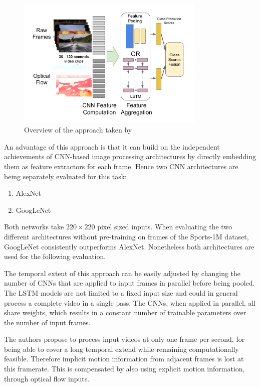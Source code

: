 \begin{figure}[H]
    \centering
    \includegraphics[width=0.8\textwidth]{img_deep/beyondshort_overview}
    \caption{Overview of the approach taken by \textcite{ng_beyond_2015}}
    \label{fig:beyondshort_overview}
\end{figure}

An advantage of this approach is that it can build on the independent achievements of CNN-based image processing architectures by directly embedding them as feature extractors for each frame.
Hence two CNN architectures are being separately evaluated for this task:

\begin{enumerate}
    \item AlexNet \cite{krizhevsky_imagenet_2012}
    \item GoogLeNet \cite{szegedy_going_2015}
\end{enumerate}

Both networks take $220\times220$ pixel sized inputs.
When evaluating the two different architectures without pre-training on frames of the Sports-1M dataset, GoogLeNet consistently outperforms AlexNet.
Nonetheless both architectures are used for the following evaluation.

The temporal extent of this approach can be easily adjusted by changing the number of CNNs that are applied to input frames in parallel before being pooled.
The LSTM models are not limited to a fixed input size and could in general process a complete video in a single pass.
The CNNs, when applied in parallel, all share weights, which results in a constant number of trainable parameters over the number of input frames.

The authors propose to process input videos at only one frame per second, for being able to cover a long temporal extend while remaining computationally feasible.
Therefore implicit motion information from adjacent frames is lost at this framerate.
This is compensated by also using explicit motion information, through optical flow inputs.

